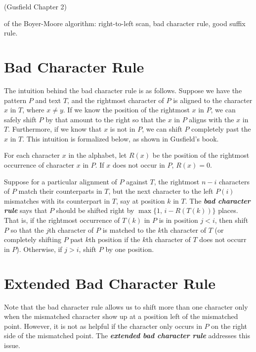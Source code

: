 (Gusfield Chapter 2)

 of the Boyer-Moore algorithm: right-to-left scan, bad character rule, good suffix rule.

\section{Bad Character Rule}

The intuition behind the bad character rule is as follows. Suppose we have the pattern $P$ and text $T$, and the rightmost character of $P$ is aligned to the character $x$ in $T$, where $x \neq y$. If we know the position of the rightmost $x$ in $P$, we can safely shift $P$ by that amount to the right so that the $x$ in $P$ aligns with the $x$ in $T$. Furthermore, if we know that $x$ is not in $P$, we can shift $P$ completely past the $x$ in $T$. This intuition is formalized below, as shown in Gusfield's book.

\begin{definition}
    For each character $x$ in the alphabet, let $R(x)$ be the position of the rightmost occurrence of character $x$ in $P$. If $x$ does not occur in $P$, $R(x) = 0$.
\end{definition}

\begin{rules} 
    \normalfont
    Suppose for a particular alignment of $P$ against $T$, the rightmost $n-i$ characters of $P$ match their counterparts in $T$, but the next character to the left $P(i)$ mismatches with its counterpart in $T$, say at position $k$ in $T$. The \textit{\textbf{bad character rule}} says that $P$ should be shifted right by $\max\{1,\, i-R(T(k))\}$ places. That is, if the rightmost occurrence of $T(k)$ in $P$ is in position $j < i$, then shift $P$ so that the $j$th character of $P$ is matched to the $k$th character of $T$ (or completely shifting $P$ past $k$th position if the $k$th character of $T$ does not occurr in $P$). Otherwise, if $j > i$, shift $P$ by one position.
\end{rules}

\section{Extended Bad Character Rule}

Note that the bad character rule allows us to shift more than one character only when the mismatched character show up at a position left of the mismatched point. However, it is not as helpful if the character only occurs in $P$ on the right side of the mismatched point. The \textit{\textbf{extended bad character rule}} addresses this issue.

